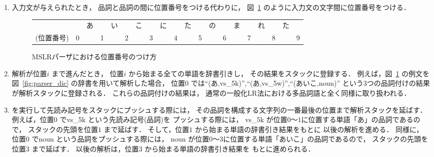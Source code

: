 \begin{enumerate}
\item
  入力文が与えられたとき，
  品詞と品詞の間に位置番号をつける代わりに，
  図~\ref{fig:mslr_posit} のように入力文の文字間に位置番号をつける．
  \begin{figure}[htb]
    \begin{center}
      \begin{tabular}{cc@{}c@{}c@{}c@{}c@{}c@{}c@{}c@{}c@{}c@{}c@{}c@{}c@{}c@{}c@{}c@{}c@{}c@{}c}
        & &あ& &い& &こ& &に& &た& &の& &ま& &れ& &た   \\[-2mm]
        {\footnotesize (位置番号)}
        &0&  &1&  &2&  &3&  &4&  &5&  &6&  &7&  &8&  &9 \\
      \end{tabular}
      \phantom{位置番号}
      
      \bigskip
      \caption{MSLRパーザにおける位置番号のつけ方}
      \label{fig:mslr_posit}
    \end{center}
  \end{figure}


\item 
  解析が位置$i$ まで進んだとき，
  位置$i$ から始まる全ての単語を辞書引きし，
  その結果をスタックに登録する．
  例えば，図~\ref{fig:mslr_posit} の例文を
  図~\ref{fig:parser_dic} の辞書を用いて解析した場合，
  位置$0$ では``(あ,vs\_5k)'',``(あ,vs\_5w)'',``(あいこ,noun)''
  という3つの品詞付けの結果が解析スタックに登録される．
  これらの品詞付けの結果は，
  通常の一般化LR法における多品詞語と全く同様に取り扱われる．

\item 
  \shact を実行して先読み記号をスタックにプッシュする際には，
  その品詞を構成する文字列の一番最後の位置まで解析スタックを延ばす．
  例えば，位置$0$ でvs\_5k という先読み記号(品詞)を
  プッシュする際には，
  vs\_5k が位置$0$〜$1$に位置する単語「あ」の品詞であるので，
  スタックの先頭を位置$1$ まで延ばす．
  そして，位置$1$ から始まる単語の辞書引き結果をもとに
  以後の解析を進める．
  同様に，位置$0$ でnoun という品詞をプッシュする際には，
  noun が位置$0$〜$3$に位置する単語「あいこ」の品詞であるので，
  スタックの先頭を位置$3$ まで延ばす．
  以後の解析は，位置$3$ から始まる単語の辞書引き結果を
  もとに進められる．
\end{enumerate}

